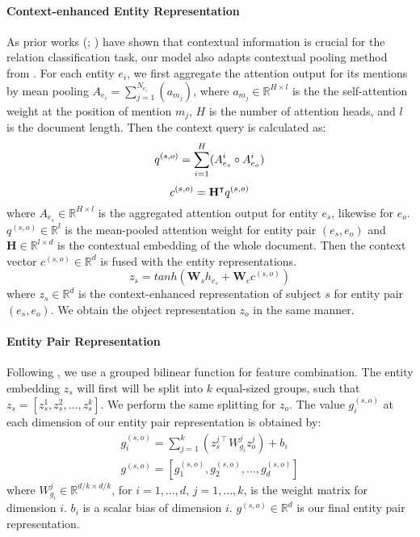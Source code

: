 \documentclass[11pt]{article}
\begin{document}
\paragraph{Context-enhanced Entity Representation} As prior works (\citealp{xu2021entity}; \citealp{peng2020learning}) have shown that contextual information is crucial for the relation classification task, our model also adapts contextual pooling method from \citet{zhou2021document}. For each entity $e_{i}$, we first aggregate the attention output for its mentions by mean pooling $A_{e_{i}} = \sum^{N_{e_{i}}}_{j=1}(a_{m_{j}})$, where $a_{m_{j}} \in \mathbb{R}^{{H}\times{l}}$ is the the self-attention weight at the position of mention $m_{j}$, $H$ is the number of attention heads, and $l$ is the document length. Then the context query is calculated as:
\begin{equation}
    \abovedisplayskip=2pt
    \belowdisplayskip=2pt
    q^{(s,o)} = \sum_{i=1}^{H} ({A^{i}_{e_{s}}} \circ {A^{i}_{e_{o}}})
\end{equation}
\begin{equation}
    \abovedisplayskip=2pt
    \belowdisplayskip=2pt
    c^{(s,o)} = \mathbf{H}^{\intercal}q^{(s,o)}
\end{equation}
where $A_{e_{s}} \in \mathbb{R}^{{H}\times{l}}$ is the aggregated attention output for entity $e_{s}$, likewise for $e_{o}$. $q^{(s,o)} \in \mathbb{R}^{{l}}$ is the mean-pooled attention weight for entity pair $(e_{s}, e_{o})$ and $\mathbf{H} \in \mathbb{R}^{{l} \times {d}}$ is the contextual embedding of the whole document. Then the context vector $c^{(s,o)} \in \mathbb{R}^{d}$ is fused with the entity representations.
\begin{equation}
    z_{s} = \mathit{tanh}(\mathbf{W}_{s}h_{e_{s}} + \mathbf{W}_{c}c^{(s,o)})
\end{equation}
where $z_{s} \in \mathbb{R}^{d}$ is the context-enhanced representation of subject $s$ for entity pair $(e_s,e_o)$. We obtain the object representation $z_{o}$ in the same manner.

\paragraph{Entity Pair Representation} Following \citet{zhou2021document}, we use a grouped bilinear function for feature combination. The entity embedding $z_{s}$ will first will be split into $k$ equal-sized groups, such that $z_{s} = [z_{s}^{1}, z_{s}^{2}, ..., z_{s}^{k}]$. We perform the same splitting for $z_{o}$. The value $g^{(s,o)}_{i}$ at each dimension of our entity pair representation is obtained by:
\begin{equation}
\begin{split}
    g^{(s,o)}_{i} = \sum^{k}_{j=1}(z^{j\intercal}_{s}W^{j}_{g_{i}}z^{j}_{o}) +b_{i} \\
    g^{(s,o)}=[g^{(s,o)}_{1}, g^{(s,o)}_{2}, ..., g^{(s,o)}_{d}]
\end{split}
\end{equation}
where $W^{j}_{g_{i}} \in \mathbb{R}^{d/k \times d/k}$, for $i=1,...,d$, $j=1,...,k$, is the weight matrix for dimension $i$. $b_{i}$ is a scalar bias of dimension $i$. $g^{(s,o)} \in \mathbb{R}^{d}$ is our final entity pair representation. 
\end{document}
